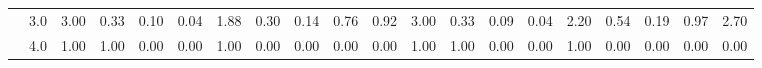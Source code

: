 \begin{tabular}{llrrrrrrrrrrrrrrrrrr}
          & 3.0 &               3.00 &                     0.33 &                                 0.10 &                             0.04 &                           1.88 &                                               0.30 &                                            0.14 &                                            0.76 &                                        0.92 &               3.00 &                     0.33 &                                 0.09 &                             0.04 &                           2.20 &                                               0.54 &                                            0.19 &                                            0.97 &                                        2.70 \\
          & 4.0 &               1.00 &                     1.00 &                                 0.00 &                             0.00 &                           1.00 &                                               0.00 &                                            0.00 &                                            0.00 &                                        0.00 &               1.00 &                     1.00 &                                 0.00 &                             0.00 &                           1.00 &                                               0.00 &                                            0.00 &                                            0.00 &                                        0.00 \\
\bottomrule
\end{tabular}
